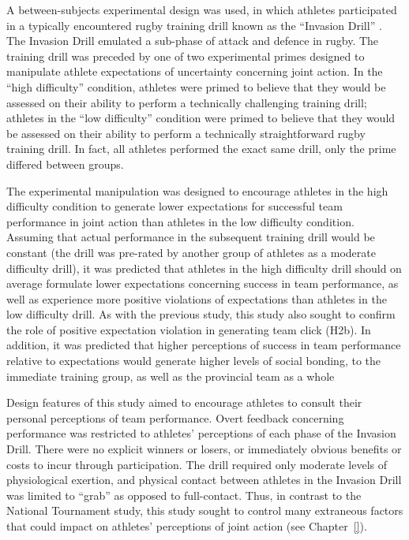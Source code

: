 \begin{CJK}{UTF8}{gbsn}
A between-subjects experimental design was used, in which athletes participated in a typically encountered rugby training drill known as the ``Invasion Drill'' \citep{Passos2011}.  The Invasion Drill emulated a sub-phase of attack and defence in rugby.  The training drill was preceded by one of two experimental primes designed to manipulate athlete expectations of uncertainty concerning joint action.  In the ``high difficulty'' condition, athletes were primed to believe that they would be assessed on their ability to perform a technically challenging training drill; athletes in the ``low difficulty'' condition were primed to believe that they would be assessed on their ability to perform a technically straightforward rugby training drill.  In fact, all athletes performed the exact same drill, only the prime differed between groups.

The experimental manipulation was designed to encourage athletes in the high difficulty condition to generate lower expectations for successful team performance in joint action than athletes in the low difficulty condition. Assuming that actual performance in the subsequent training drill would be constant (the drill was pre-rated by another group of athletes as a moderate difficulty drill), it was predicted that athletes in the high difficulty drill should on average formulate lower expectations concerning success in team performance, as well as experience more positive violations of expectations than athletes in the low difficulty drill.   As with the previous study, this study also sought to confirm the role of positive expectation violation in generating team click (H2b).  In addition, it was predicted that higher perceptions of success in team performance relative to expectations would generate higher levels of social bonding, to the immediate training group, as well as the provincial team as a whole

Design features of this study aimed to encourage athletes to consult their personal perceptions of team performance.  Overt feedback concerning performance was restricted to athletes' perceptions of each phase of the Invasion Drill.   There were no explicit winners or losers, or immediately obvious benefits or costs to incur through participation.  The drill required only moderate levels of physiological exertion, and physical contact between athletes in the Invasion Drill was limited to ``grab'' as opposed to full-contact.  Thus, in contrast to the   National Tournament study, this study sought to control many extraneous factors that could impact on athletes' perceptions of joint action (see Chapter~\ref{}).


\end{CJK}

